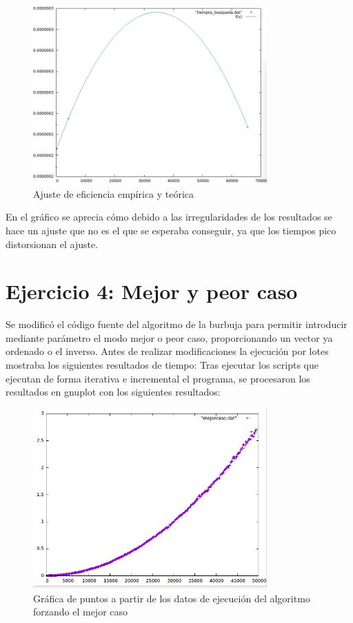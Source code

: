 \documentclass[paper=a4, fontsize=10pt]{scrartcl} %
\begin{document}
\begin{figure}[H] %
	\centering
	\label{lsblk}
	\includegraphics[width=0.8\textwidth]{../imgs/ejercicio3c.PNG}
	\caption{Ajuste de eficiencia empírica y teórica} 
\end{figure}

En el gráfico se aprecia cómo debido a las irregularidades de los resultados se hace un ajuste que no es el que se esperaba conseguir, ya que los tiempos pico distorsionan el ajuste.

\section{Ejercicio 4:  Mejor y peor caso}
Se modificó el código fuente del algoritmo de la burbuja para permitir introducir mediante parámetro el modo mejor o peor caso, proporcionando un vector ya ordenado o el inverso.
Antes de realizar modificaciones la ejecución por lotes mostraba los siguientes resultados de tiempo:
Tras ejecutar los scripts que ejecutan de forma iterativa e incremental el programa, se procesaron los resultados en gnuplot con los siguientes resultados:

\begin{figure}[H] %
	\centering
	\label{lsblk}
	\includegraphics[width=0.8\textwidth]{../imgs/ejercicio4a.PNG}
	\caption{Gráfica de puntos a partir de los datos de ejecución del algoritmo forzando el mejor caso} 
\end{figure}
\end{document}
